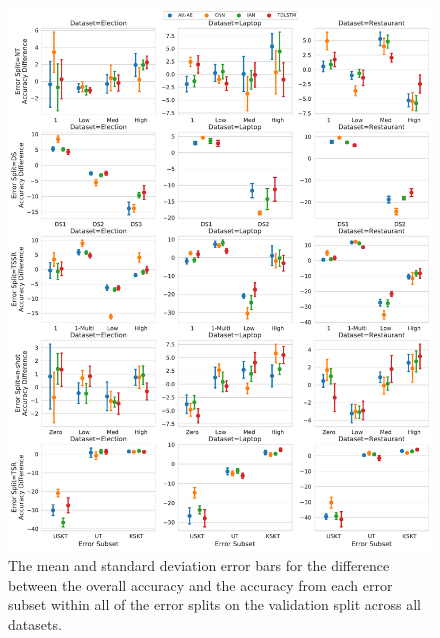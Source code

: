 \begin{figure}[h!]
    \centering
    \includegraphics[scale=0.42]{images/augmentation/methods_performance/baseline/validation_error_diff_subsets.pdf}
    \caption{The mean and standard deviation error bars for the difference between the overall accuracy and the accuracy from each error subset within all of the error splits on the validation split across all datasets.}
    \label{fig:aug_baseline_validation_error_diff_subset}
\end{figure}

